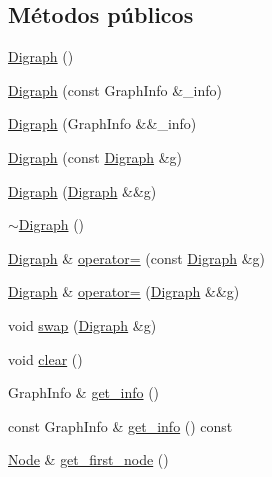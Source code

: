 \subsection*{Métodos públicos}
\begin{DoxyCompactItemize}
\item 
\hyperlink{class_designar_1_1_digraph_ae57ac8513bfcb29602cc08a3d4bc7485}{Digraph} ()
\item 
\hyperlink{class_designar_1_1_digraph_ae5210934b3e6e64caceffee62ff1fcad}{Digraph} (const Graph\+Info \&\+\_\+info)
\item 
\hyperlink{class_designar_1_1_digraph_a534b12da4e0aeb32cff655f05e6c91a4}{Digraph} (Graph\+Info \&\&\+\_\+info)
\item 
\hyperlink{class_designar_1_1_digraph_aa9aa4e8efc114df20a9a10162d43fe40}{Digraph} (const \hyperlink{class_designar_1_1_digraph}{Digraph} \&g)
\item 
\hyperlink{class_designar_1_1_digraph_a109844989cf0ab480ab6fa6f879bf9a9}{Digraph} (\hyperlink{class_designar_1_1_digraph}{Digraph} \&\&g)
\item 
\hyperlink{class_designar_1_1_digraph_aad5e79759f512c213756d22b9ec384bf}{$\sim$\+Digraph} ()
\item 
\hyperlink{class_designar_1_1_digraph}{Digraph} \& \hyperlink{class_designar_1_1_digraph_aa103ce06fd4669e9ced86aa0091ca30c}{operator=} (const \hyperlink{class_designar_1_1_digraph}{Digraph} \&g)
\item 
\hyperlink{class_designar_1_1_digraph}{Digraph} \& \hyperlink{class_designar_1_1_digraph_a49d249b31aade5fff6520aaec60cae78}{operator=} (\hyperlink{class_designar_1_1_digraph}{Digraph} \&\&g)
\item 
void \hyperlink{class_designar_1_1_digraph_a1ee489fd2a20e284a5291943ec2057cb}{swap} (\hyperlink{class_designar_1_1_digraph}{Digraph} \&g)
\item 
void \hyperlink{class_designar_1_1_digraph_a1ec067a8df6129b27e4d79c9c2755899}{clear} ()
\item 
Graph\+Info \& \hyperlink{class_designar_1_1_digraph_a530d2befede0eede246d9eed6c05f1f6}{get\+\_\+info} ()
\item 
const Graph\+Info \& \hyperlink{class_designar_1_1_digraph_a113a9f5a392795312a2d0c0d5c86041c}{get\+\_\+info} () const
\item 
\hyperlink{class_designar_1_1_digraph_a4dc921c41a480b7946a04170e997d8ae}{Node} \& \hyperlink{class_designar_1_1_digraph_a420caa785d93decc7b096de9e51644e7}{get\+\_\+first\+\_\+node} ()
\item 

\end{DoxyCompactItemize}
